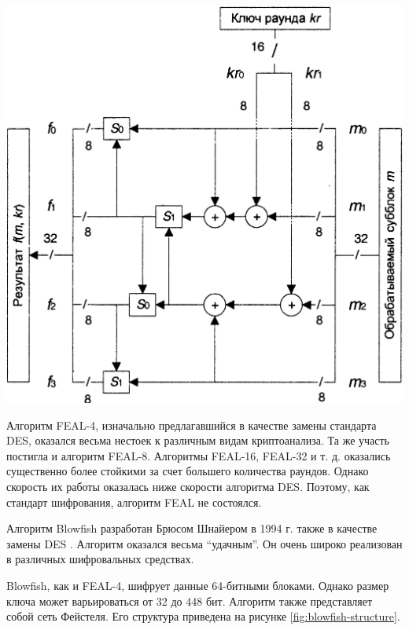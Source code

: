 \noindent
\begin{minipage}{\linewidth}
  \centering
  \vspace{3.5mm}
  \includegraphics[scale=0.2]{./pics/feal-nx-f.png}
  \label{fig:feal-nx-f}
  \vspace{3.5mm}
\end{minipage}

Алгоритм FEAL-4, изначально предлагавшийся в качестве замены стандарта DES,
оказался весьма нестоек к различным видам криптоанализа. Та же участь постигла
и алгоритм FEAL-8. Алгоритмы FEAL-16, FEAL-32 и т. д. оказались существенно
более стойкими за счет большего количества раундов. Однако скорость их работы
оказалась ниже скорости алгоритма DES. Поэтому, как стандарт шифрования,
алгоритм FEAL не состоялся.

Алгоритм Blowfish разработан Брюсом Шнайером в 1994 г. также в качестве
замены DES \cite[стр. 118]{panasenko}.
Алгоритм оказался весьма ``удачным''. Он очень широко реализован в различных
шифровальных средствах.

Blowfish, как и FEAL-4, шифрует данные 64-битными блоками. Однако размер
ключа может варьироваться от 32 до 448 бит. Алгоритм также представляет
собой сеть Фейстеля. Его структура приведена на рисунке \ref{fig:blowfish-structure}.

